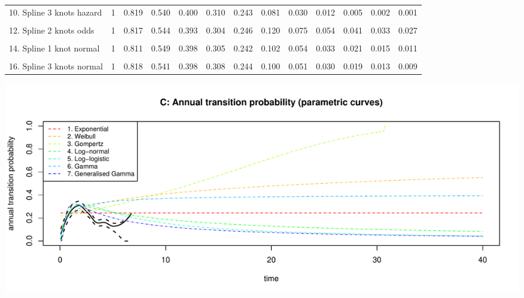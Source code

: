 \documentclass[
]{article}
\begin{document}
\begin{table}
{\begin{tabular}[t]{lrrrrrrrrrrrr}
10. Spline 3 knots hazard & 1 & 0.819 & 0.540 & 0.400 & 0.310 & 0.243 & 0.081 & 0.030 & 0.012 & 0.005 & 0.002 & 0.001\\
\cellcolor{gray!6}{11. Spline 1 knot odds} & \cellcolor{gray!6}{1} & \cellcolor{gray!6}{0.820} & \cellcolor{gray!6}{0.542} & \cellcolor{gray!6}{0.390} & \cellcolor{gray!6}{0.303} & \cellcolor{gray!6}{0.248} & \cellcolor{gray!6}{0.127} & \cellcolor{gray!6}{0.082} & \cellcolor{gray!6}{0.060} & \cellcolor{gray!6}{0.047} & \cellcolor{gray!6}{0.038} & \cellcolor{gray!6}{0.032}\\
12. Spline 2 knots odds & 1 & 0.817 & 0.544 & 0.393 & 0.304 & 0.246 & 0.120 & 0.075 & 0.054 & 0.041 & 0.033 & 0.027\\
\cellcolor{gray!6}{13. Spline 3 knots odds} & \cellcolor{gray!6}{1} & \cellcolor{gray!6}{0.818} & \cellcolor{gray!6}{0.542} & \cellcolor{gray!6}{0.398} & \cellcolor{gray!6}{0.308} & \cellcolor{gray!6}{0.246} & \cellcolor{gray!6}{0.110} & \cellcolor{gray!6}{0.065} & \cellcolor{gray!6}{0.044} & \cellcolor{gray!6}{0.033} & \cellcolor{gray!6}{0.026} & \cellcolor{gray!6}{0.021}\\
14. Spline 1 knot normal & 1 & 0.811 & 0.549 & 0.398 & 0.305 & 0.242 & 0.102 & 0.054 & 0.033 & 0.021 & 0.015 & 0.011\\
\cellcolor{gray!6}{15. Spline 2 knots normal} & \cellcolor{gray!6}{1} & \cellcolor{gray!6}{0.815} & \cellcolor{gray!6}{0.546} & \cellcolor{gray!6}{0.392} & \cellcolor{gray!6}{0.303} & \cellcolor{gray!6}{0.245} & \cellcolor{gray!6}{0.113} & \cellcolor{gray!6}{0.065} & \cellcolor{gray!6}{0.042} & \cellcolor{gray!6}{0.029} & \cellcolor{gray!6}{0.021} & \cellcolor{gray!6}{0.016}\\
16. Spline 3 knots normal & 1 & 0.818 & 0.541 & 0.398 & 0.308 & 0.244 & 0.100 & 0.051 & 0.030 & 0.019 & 0.013 & 0.009\\
\bottomrule
\end{tabular}}
\end{table}

\begin{flushleft}\includegraphics[height=0.29\textheight]{Images/validate_extrapolation3-3} \end{flushleft}
\end{document}
